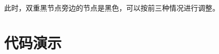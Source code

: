 \documentclass{note}
\begin{document}
此时，双重黑节点旁边的节点是黑色，可以按前三种情况进行调整。
\newpage
\section{代码演示
    \texorpdfstring{\cite{insert_code}}{}
    \texorpdfstring{\cite{delete_code}}{}}
\begin{framed}
    
\end{framed}


\end{document}
